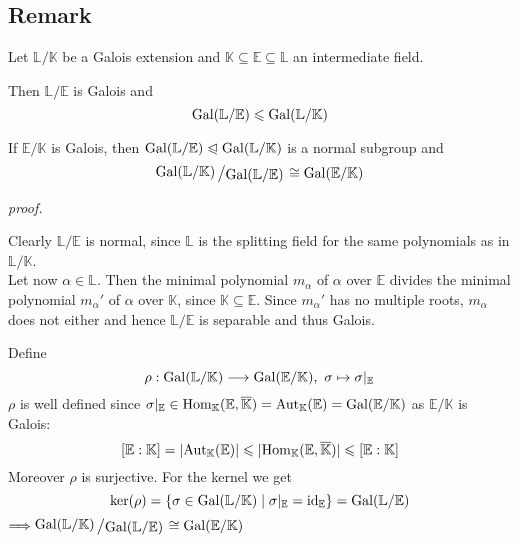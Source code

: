 \documentclass[12pt]{book}
\newcommand{\slant}[2]{{\raisebox{.1em}{$#1$}\left/\raisebox{-.1em}{$#2$}\right.}}
\begin{document}
\begin{spacing}{1.3}
\subsection{Remark} %
Let $\mathbb{L}/\mathbb{K}$ be a Galois extension and $\mathbb{K}\subseteq \mathbb{E} \subseteq \mathbb{L}$ an intermediate field.
\begin{compactenum}
\item Then $\mathbb{L}/\mathbb{E}$ is Galois and $$\rm{Gal}(\mathbb{L}/\mathbb{E}) \leqslant \rm{Gal}(\mathbb{L}/\mathbb{K})$$
\item If $\mathbb{E}/\mathbb{K}$ is Galois, then $\rm{Gal}(\mathbb{L}/\mathbb{E}) \trianglelefteqslant \rm{Gal}(\mathbb{L}/\mathbb{K})$ is a normal subgroup and 
$$\slant{\rm{Gal}(\mathbb{L}/\mathbb{K})}{\rm{Gal}(\mathbb{L}/\mathbb{E})} \cong \rm{Gal}(\mathbb{E}/\mathbb{K})$$
\end{compactenum}
\textit{proof.}
\begin{compactenum}
\item Clearly $\mathbb{L}/\mathbb{E}$ is normal, since $\mathbb{L}$ is the splitting field for the same polynomials as in $\mathbb{L}/\mathbb{K}$.\\
Let now $\alpha \in \mathbb{L}$. Then the minimal polynomial $m_{\alpha}$ of $\alpha$ over $\mathbb{E}$ divides the minimal polynomial $m_{\alpha}'$ of $\alpha$ over $\mathbb{K}$, since $\mathbb{K} \subseteq \mathbb{E}$. Since $m_{\alpha}'$ has no multiple roots, $m_{\alpha}$ does not either and hence $\mathbb{L}/\mathbb{E}$ is separable and thus Galois.
\item Define
$$\rho: \rm{Gal}(\mathbb{L}/\mathbb{K}) \longrightarrow \rm{Gal}(\mathbb{E}/\mathbb{K}), \textrm{ }\sigma \mapsto \sigma |_{\mathbb{E}}$$
$\rho$ is well defined since $\sigma |_{\mathbb{E}} \in \rm{Hom}_{\mathbb{K}}(\mathbb{E}, \overline{\mathbb{K}})=\rm{Aut}_{\mathbb{K}}(\mathbb{E})=\textrm{Gal}(\mathbb{E}/\mathbb{K})$ as $\mathbb{E}/\mathbb{K}$ is Galois:
$$ [\mathbb{E}:\mathbb{K}] = \vert \rm{Aut}_{\mathbb{K}}(\mathbb{E}) \vert  \leqslant \vert \rm{Hom}_{\mathbb{K}}(\mathbb{E}, \overline{\mathbb{K}}) \vert \leqslant [\mathbb{E}:\mathbb{K}]$$
Moreover $\rho$ is surjective. For the kernel we get
$$\ker(\rho)=\{\sigma \in \rm{Gal}(\mathbb{L}/\mathbb{K}) \mid \sigma |_{\mathbb{E}} = \rm{id}_{\mathbb{E}} \} = \rm{Gal}(\mathbb{L}/\mathbb{E})$$
$\Longrightarrow \slant{\rm{Gal}(\mathbb{L}/\mathbb{K})}{\rm{Gal}(\mathbb{L}/\mathbb{E})} \cong \rm{Gal}(\mathbb{E}/\mathbb{K})$
\end{compactenum}


\end{spacing}
\end{document}
